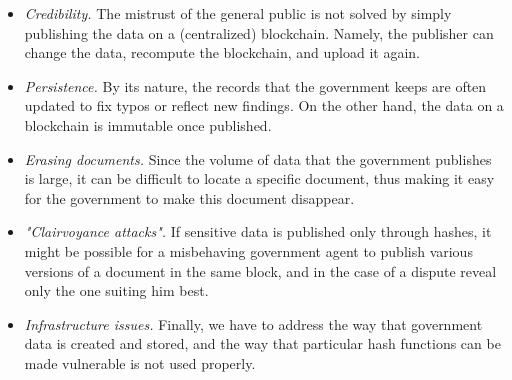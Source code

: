 \begin{itemize}
\item {\it Credibility.} The mistrust of the general public is not solved by simply publishing the data on a (centralized) blockchain. Namely, the publisher can change the data, recompute the blockchain, and upload it again.
\item {\it Persistence.} By its nature, the records that the government keeps are often updated to fix typos or reflect new findings. On the other hand, the data on a blockchain is immutable once published.
\item {\it Erasing documents.} Since the volume of data that the government publishes is large, it can be difficult to locate a specific document, thus making it easy for the government to make this document disappear.
\item {\it "Clairvoyance attacks".} If sensitive data is published only through hashes, it might be possible for a misbehaving government agent to publish various versions of a document in the same block, and in the case of a dispute reveal only the one suiting him best.
\item {\it Infrastructure issues.} Finally, we have to address the way that government data is created and stored, and the way that particular hash functions can be made vulnerable is not used properly. 
\end{itemize}